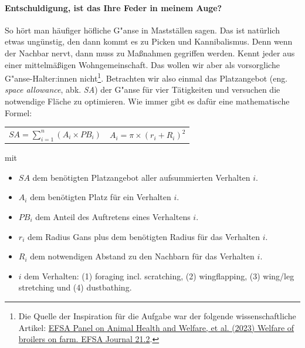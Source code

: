 \documentclass[a4paper, 9pt]{scrartcl}\usepackage[]{graphicx}\usepackage[]{xcolor}
\begin{document}
\paragraph{Entschuldigung, ist das Ihre Feder in meinem Auge?}



So h{\"o}rt man h{\"a}ufiger h{\"o}fliche G{"a}nse in Mastst{\"a}llen sagen. Das
ist nat{\"u}rlich etwas ung{\"u}nstig, den dann kommt es zu Picken und
Kannibalismus. Denn wenn der Nachbar nervt, dann muss zu Ma{\ss}nahmen
gegriffen werden. Kennt jeder aus einer mittelm{\"a}{\ss}igen Wohngemeinschaft. Das
wollen wir aber als vorsorgliche G{"a}nse-Halter:innen
nicht\footnote{Die Quelle der Inspiration f{\"u}r die Aufgabe war der folgende
  wissenschaftliche Artikel:
  \href{https://www.efsa.europa.eu/en/efsajournal/pub/7788}{EFSA Panel on
    Animal Health and Welfare, et al. (2023) Welfare of broilers on
    farm. EFSA Journal 21.2}.}. Betrachten wir also einmal das Platzangebot
(eng. \textit{space allowance}, abk. \textit{SA}) der G{"a}nse
f{\"u}r vier T{\"a}tigkeiten und versuchen die notwendige Fl{\"a}che zu optimieren. Wie
immer gibt es daf{\"u}r eine mathematische Formel:


\begin{center}
  \begin{tabular}{cc}
    $SA = \sum^n_{i = 1} (A_i \times PB_i)$ & $A_i = \pi \times (r_i + R_i)^2$\\
  \end{tabular}
\end{center}

\vspace{-2Ex}

mit

\begin{itemize}[noitemsep]
\item $SA$ dem ben{\"o}tigten Platzangebot aller aufsummierten Verhalten $i$.
\item $A_i$ dem ben{\"o}tigten Platz f{\"u}r ein Verhalten $i$. 
\item $PB_i$ dem Anteil des Auftretens eines Verhaltens $i$.
\item $r_i$ dem Radius Gans plus dem ben{\"o}tigten Radius f{\"u}r das Verhalten $i$.
\item $R_i$ dem notwendigen Abstand zu den Nachbarn f{\"u}r das Verhalten $i$.    
\item $i$ dem Verhalten: (1) foraging incl. scratching, (2) wingflapping, (3)
  wing/leg stretching und (4) dustbathing.
\end{itemize}
\end{document}
